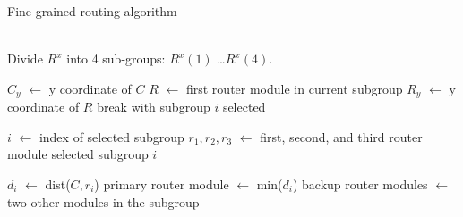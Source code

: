 \begin{algorithm}
\caption{Fine-grained routing algorithm}
\label{alg:fgr}
\begin{algorithmic}[1]
 \\ 
\State Divide $R^x$ into 4 sub-groups: $R^x(1)$ \ldots $R^x(4)$.

    \State $C_y$ $\leftarrow$ y coordinate of $C$
    \State $R$ $\leftarrow$ first router module in current subgroup
    \State $R_y$ $\leftarrow$ y coordinate of $R$
    \State break with subgroup $i$ selected
    \EndIf
\EndFor

\State $i$ $\leftarrow$ index of selected subgroup
\State $r_1, r_2, r_3$ $\leftarrow$ first, second, and third router module 
\State \hspace{\algorithmicindent} selected subgroup $i$

    \State $d_i$ $\leftarrow$ dist($C, r_i$) 
    \State primary router module $\leftarrow$ min($d_i$)
    \State backup router modules $\leftarrow$ 
     two other modules in the subgroup 
\EndFor
\EndProcedure
\\
\end{algorithmic}
\end{algorithm}

\begin{comment}
With router placement in place, we now face the question that, how does each
client select which router to minimize communication hops as well as to avoid
congestion. This section provides an overview on route selection process and
algorithms. Routers are divided into 9 groups, with each group containing 12
router modules. We denote a router group with a superscript, and a router
module in that group with a subscript. For example, the first module in a
router group $A$ is denoted as $R^A_1$ so on and so forth. The following
algorithm describe the core idea of selection process. The input is a given
router group and client ID, the output is a triple: primary router and two back
up routers.
\end{comment}




